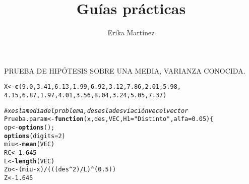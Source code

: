 \documentclass[10pt,a4paper]{article}\usepackage[]{graphicx}\usepackage[]{color}
\author{Erika Martínez}
\title{Guías prácticas}
\makeatletter
\newcommand{\hlnum}[1]{\textcolor[rgb]{0.686,0.059,0.569}{#1}}%
\newcommand{\hlstr}[1]{\textcolor[rgb]{0.192,0.494,0.8}{#1}}%
\newcommand{\hlcom}[1]{\textcolor[rgb]{0.678,0.584,0.686}{\textit{#1}}}%
\newcommand{\hlopt}[1]{\textcolor[rgb]{0,0,0}{#1}}%
\newcommand{\hlstd}[1]{\textcolor[rgb]{0.345,0.345,0.345}{#1}}%
\newcommand{\hlkwa}[1]{\textcolor[rgb]{0.161,0.373,0.58}{\textbf{#1}}}%
\newcommand{\hlkwb}[1]{\textcolor[rgb]{0.69,0.353,0.396}{#1}}%
\newcommand{\hlkwc}[1]{\textcolor[rgb]{0.333,0.667,0.333}{#1}}%
\newcommand{\hlkwd}[1]{\textcolor[rgb]{0.737,0.353,0.396}{\textbf{#1}}}%
\newenvironment{kframe}{%
 \def\at@end@of@kframe{}%
 \ifinner\ifhmode%
  \def\at@end@of@kframe{\end{minipage}}%
  \begin{minipage}{\columnwidth}%
 \fi\fi%
 \def\FrameCommand##1{\hskip\@totalleftmargin \hskip-\fboxsep
 \colorbox{shadecolor}{##1}\hskip-\fboxsep
     \hskip-\linewidth \hskip-\@totalleftmargin \hskip\columnwidth}%
 \MakeFramed {\advance\hsize-\width
   \@totalleftmargin\z@ \linewidth\hsize
   \@setminipage}}%
 {\par\unskip\endMakeFramed%
 \at@end@of@kframe}
\newenvironment{knitrout}{}{} %
\makeatother
\begin{document}
\maketitle
\newpage


PRUEBA DE HIPÓTESIS SOBRE UNA MEDIA, VARIANZA CONOCIDA.
\begin{knitrout}
\color{fgcolor}\begin{kframe}
\begin{alltt}
\hlstd{X} \hlkwb{<-} \hlkwd{c}\hlstd{(}\hlnum{9.0}\hlstd{,} \hlnum{3.41}\hlstd{,} \hlnum{6.13}\hlstd{,} \hlnum{1.99}\hlstd{,} \hlnum{6.92}\hlstd{,} \hlnum{3.12}\hlstd{,} \hlnum{7.86}\hlstd{,} \hlnum{2.01}\hlstd{,} \hlnum{5.98}\hlstd{,}
       \hlnum{4.15}\hlstd{,} \hlnum{6.87}\hlstd{,} \hlnum{1.97}\hlstd{,} \hlnum{4.01}\hlstd{,} \hlnum{3.56}\hlstd{,} \hlnum{8.04}\hlstd{,} \hlnum{3.24}\hlstd{,} \hlnum{5.05}\hlstd{,} \hlnum{7.37}\hlstd{)}


\hlcom{#x es la media del problema, des es la desviación vec el vector}
\hlstd{Prueba.param} \hlkwb{<-} \hlkwa{function}\hlstd{(}\hlkwc{x}\hlstd{,} \hlkwc{des}\hlstd{,} \hlkwc{VEC}\hlstd{,} \hlkwc{H1}\hlstd{=}\hlstr{"Distinto"}\hlstd{,} \hlkwc{alfa}\hlstd{=}\hlnum{0.05}\hlstd{)\{}
  \hlstd{op} \hlkwb{<-} \hlkwd{options}\hlstd{();}
  \hlkwd{options}\hlstd{(}\hlkwc{digits}\hlstd{=}\hlnum{2}\hlstd{)}
  \hlstd{miu}\hlkwb{<-} \hlkwd{mean}\hlstd{(VEC)}
  \hlstd{RC}\hlkwb{<-} \hlnum{1.645}
  \hlstd{L}\hlkwb{<-} \hlkwd{length}\hlstd{(VEC)}
  \hlstd{Zo}\hlkwb{<-}\hlstd{(miu}\hlopt{-}\hlstd{x)}\hlopt{/}\hlstd{(((des}\hlopt{^}\hlnum{2}\hlstd{)}\hlopt{/}\hlstd{L)}\hlopt{^}\hlstd{(}\hlnum{0.5}\hlstd{))}
  \hlstd{Z}\hlkwb{<-} \hlnum{1.645}


\end{alltt}
\end{kframe}
\end{knitrout}
\end{document}
